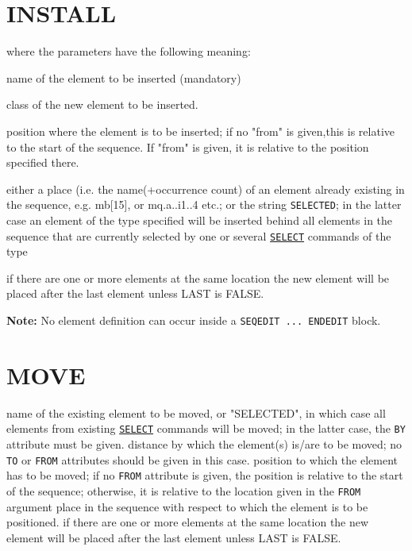 \section{INSTALL}
\label{sec:install}
where the parameters have the following meaning:
\begin{madlist}
    name of the element to be inserted (mandatory)

    class of the new element to be inserted.

    position where the element is to be inserted; if no "from"
     is given,this is relative to the start of the sequence. If "from"
     is given, it is relative to the position specified there.

    either a place (i.e. the name(+occurrence count) of an
     element already existing in the sequence, e.g. mb[15], or
     mq.a..i1..4 etc.; or the string \texttt{SELECTED}; in the latter
     case an element of the type specified will be inserted behind all
     elements in the sequence that are currently selected by one or several
     \hyperref[sec:select]{\texttt{SELECT}} commands of the type

    if there are one or more elements at the same location the new element
    will be placed after the last element unless LAST is FALSE.

\end{madlist}

\textbf{Note:} No element definition can occur inside a \texttt{SEQEDIT
  ... ENDEDIT} block.


\section{MOVE}
\label{sec:move}
\begin{madlist}
   name of the existing element to be moved, or
  "SELECTED", in which case all elements from existing
  \hyperref[sec:select]{\texttt{SELECT}} commands will be moved;
  in the latter case, the \texttt{BY} attribute must be given.
   distance by which the element(s) is/are to be moved; no
  \texttt{TO} or \texttt{FROM} attributes should be given in this case.
   position to which the element has to be moved; if no
  \texttt{FROM} attribute is given, the position is relative to the
  start of the sequence; otherwise, it is relative to the location
  given in the \texttt{FROM} argument
   place in the sequence with respect to which the element
  is to be positioned.
   if there are one or more elements at the same location the new element
   will be placed after the last element unless LAST is FALSE.
\end{madlist}

